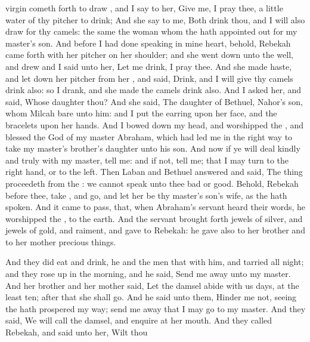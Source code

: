 {virgin cometh
forth to
draw
{}, and I
say to her, Give
me, I pray thee, a
little
water of thy
pitcher to
drink;
And she
say to me, Both
drink thou, and I will also
draw for thy
camels:
{} the same
{} the
woman whom the
{} hath appointed
out for my
master’s
son.
And before I had
done
speaking in mine
heart, behold,
Rebekah came
forth with her
pitcher on her
shoulder; and she went
down unto the
well, and
drew
{} and I
said unto her, Let me
drink, I pray thee.
And she made
haste, and let
down her
pitcher from her
{}, and
said,
Drink, and I will
give thy
camels
drink also: so I
drank, and she
made the
camels
drink also.
And I
asked her, and
said, Whose
daughter
{} thou? And she
said, The
daughter of
Bethuel,
Nahor’s
son, whom
Milcah
bare unto him: and I
put the
earring upon her
face, and the
bracelets upon her
hands.
And I bowed down my
head, and
worshipped the
{}, and
blessed the
{}
God of my
master
Abraham, which had led
me in the
right
way to
take my
master’s
brother’s
daughter unto his
son.
And now if ye
will
deal
kindly and
truly with my
master,
tell me: and if not,
tell me; that I may
turn to the right
hand,
or to the
left.
Then
Laban and
Bethuel
answered and
said, The
thing
proceedeth from the
{}: we
cannot
speak unto thee
bad
or
good.
Behold,
Rebekah
{} before
thee,
take
{}, and
go, and let her be thy
master’s
son’s
wife, as the
{} hath
spoken.
And it came to pass, that, when
Abraham’s
servant
heard their
words, he
worshipped the
{},
{} to the
earth.
And the
servant brought
forth
jewels of
silver, and
jewels of
gold, and
raiment, and
gave
{} to
Rebekah: he
gave also to her
brother and to her
mother precious
things.
\par }{\PP {}And they did
eat and
drink, he and the
men that
{} with him, and tarried all
night; and they rose
up in the
morning, and he
said, Send me
away unto my
master.
And her
brother and her
mother
said, Let the
damsel
abide with us
{}
days, at the
least
ten;
after that she shall
go.
And he
said unto them, Hinder
me not, seeing the
{} hath
prospered my
way; send me
away that I may
go to my
master.
And they
said, We will
call the
damsel, and
enquire at her
mouth.
And they
called
Rebekah, and
said unto her, Wilt thou
}
